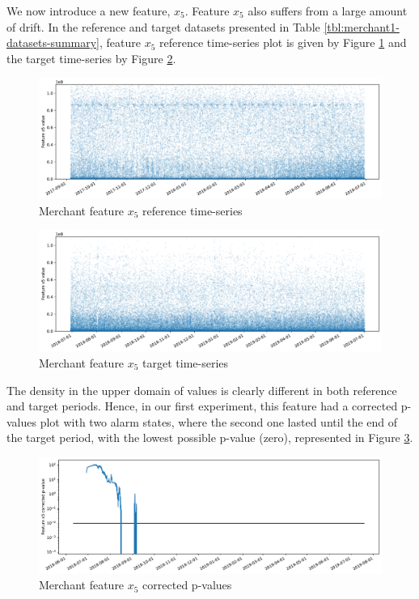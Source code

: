 \documentclass[sigconf]{acmart}
\begin{document}
We now introduce a new feature, $x_5$. Feature $x_5$ also suffers from a large amount of drift. In the reference and target datasets presented in Table \ref{tbl:merchant1-datasets-summary}, feature $x_5$ reference time-series plot is given by Figure \ref{fig:merchant-x5-reference} and the target time-series by Figure \ref{fig:merchant-x5-target}.
\begin{figure}[!htb]
    \begin{center}
      \includegraphics[scale=0.25]{figures/merchant-x5-reference.pdf}
      \caption{Merchant feature $x_5$ reference time-series}
      \label{fig:merchant-x5-reference}
    \end{center}
\end{figure}
\begin{figure}[!htb]
    \begin{center}
      \includegraphics[scale=0.25]{figures/merchant-x5-target.pdf}
      \caption{Merchant feature $x_5$ target time-series}
      \label{fig:merchant-x5-target}
    \end{center}
\end{figure}
The density in the upper domain of values is clearly different in both reference and target periods. Hence, in our first experiment, this feature had a corrected p-values plot with two alarm states, where the second one lasted until the end of the target period, with the lowest possible p-value (zero), represented in Figure \ref{fig:merchant-x5-correctedpvalues}.
\begin{figure}[!htb]
    \begin{center}
      \includegraphics[scale=0.25]{figures/merchant-x5-correctedpvalues.pdf}
      \caption{Merchant feature $x_5$ corrected p-values}
      \label{fig:merchant-x5-correctedpvalues}
    \end{center}
\end{figure}
\end{document}
